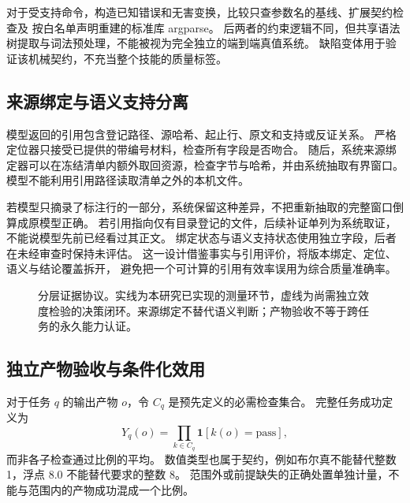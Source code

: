 对于受支持命令，构造已知错误和无害变换，比较只查参数名的基线、扩展契约检查及
按白名单声明重建的标准库 argparse。
后两者的约束逻辑不同，但共享语法树提取与词法预处理，不能被视为完全独立的端到端真值系统。
缺陷变体用于验证该机械契约，不充当整个技能的质量标签。

\subsection{来源绑定与语义支持分离}
模型返回的引用包含登记路径、源哈希、起止行、原文和支持或反证关系。
严格定位器只接受已提供的带编号材料，检查所有字段是否吻合。
随后，系统来源绑定器可以在冻结清单内额外取回资源，检查字节与哈希，并由系统抽取有界窗口。
模型不能利用引用路径读取清单之外的本机文件。

若模型只摘录了标注行的一部分，系统保留这种差异，不把重新抽取的完整窗口倒算成原模型正确。
若引用指向仅有目录登记的文件，后续补证单列为系统取证，不能说模型先前已经看过其正文。
绑定状态与语义支持状态使用独立字段，后者在未经审查时保持未评估。
这一设计借鉴事实与引用评价\citep{P39,P40,P41}，将版本绑定、定位、语义与结论覆盖拆开，
避免把一个可计算的引用有效率误用为综合质量准确率。

\begin{figure}[t]
\centering
{}
\caption{分层证据协议。实线为本研究已实现的测量环节，虚线为尚需独立效度检验的决策闭环。来源绑定不替代语义判断；产物验收不等于跨任务的永久能力认证。}
\label{fig:protocol}
\end{figure}

\subsection{独立产物验收与条件化效用}
对于任务 $q$ 的输出产物 $o$，令 $C_q$ 是预先定义的必需检查集合。
完整任务成功定义为
\begin{equation}
Y_q(o)=\prod_{k\in C_q}\mathbf{1}[k(o)=\mathrm{pass}],
\label{eq:success}
\end{equation}
而非各子检查通过比例的平均。
数值类型也属于契约，例如布尔真不能替代整数 1，浮点 8.0 不能替代要求的整数 8。
范围外或前提缺失的正确处置单独计量，不能与范围内的产物成功混成一个比例。

